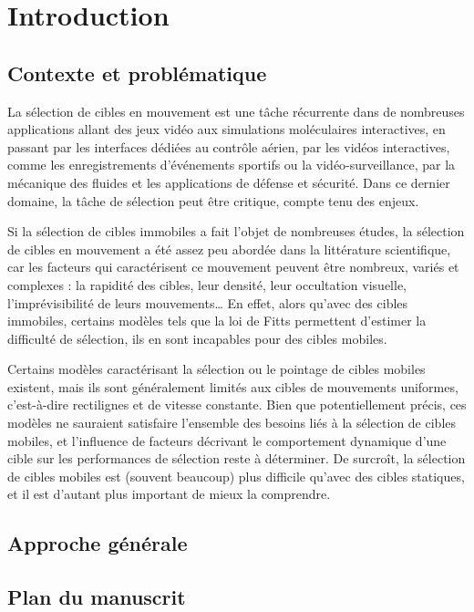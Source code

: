 

\chapter{Introduction} %


\section{Contexte et problématique}
	La sélection de cibles en mouvement est une tâche récurrente dans de nombreuses applications allant des jeux vidéo aux simulations moléculaires interactives, en passant par les interfaces dédiées au contrôle aérien, par les vidéos interactives, comme les enregistrements d'événements sportifs ou la vidéo-surveillance, par la mécanique des fluides et les applications de défense et sécurité. Dans ce dernier domaine, la tâche de sélection peut être critique, compte tenu des enjeux.
	
	Si la sélection de cibles immobiles a fait l'objet de nombreuses études, la sélection de cibles en mouvement a été assez peu abordée dans la littérature scientifique, car les facteurs qui caractérisent ce mouvement peuvent être nombreux, variés et complexes : la rapidité des cibles, leur densité, leur occultation visuelle, l'imprévisibilité de leurs mouvements\ldots{} En effet, alors qu’avec des cibles immobiles, certains modèles tels que la loi de Fitts permettent d’estimer la difficulté de sélection, ils en sont incapables pour des cibles mobiles.
	
	Certains modèles caractérisant la sélection ou le pointage de cibles mobiles existent, mais ils sont généralement limités aux cibles de mouvements uniformes, c'est-à-dire rectilignes et de vitesse constante. Bien que potentiellement précis, ces modèles ne sauraient satisfaire l'ensemble des besoins liés à la sélection de cibles mobiles, et l'influence de facteurs décrivant le comportement dynamique d'une cible sur les performances de sélection reste à déterminer. De surcroît, la sélection de cibles mobiles est (souvent beaucoup) plus difficile qu'avec des cibles statiques, et il est d'autant plus important de mieux la comprendre.


    



 
\section{Approche générale}


\section{Plan du manuscrit}
